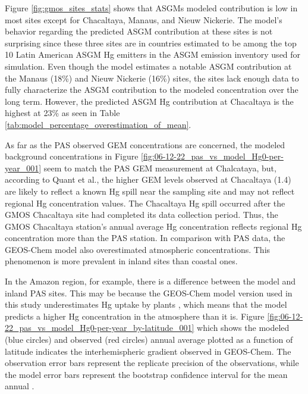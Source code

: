 \begin{flushleft}
Figure \ref{fig:gmos_sites_stats} shows that ASGMs modeled contribution is low in most sites except for Chacaltaya, Manaus, and Nieuw Nickerie. The model's behavior regarding the predicted ASGM contribution at these sites is not surprising since these three sites are in countries estimated to be among the top 10 Latin American ASGM Hg emitters in the ASGM emission inventory used for \gc simulation. Even though the model estimates a notable ASGM contribution at the Manaus (18\%) and Nieuw Nickerie (16\%) sites, the sites lack enough data to fully characterize the ASGM contribution to the modeled \hg concentration over the long term. However, the predicted  ASGM Hg contribution at Chacaltaya is the highest at 23\% as seen in Table \ref{tab:model_percentage_overestimation_of_mean}. 
\end{flushleft}

\begin{flushleft}
 As far as the PAS observed GEM concentrations are concerned, the modeled background \hg concentrations in Figure \ref{fig:06-12-22_pas_vs_model_Hg0-per-year_001} seem to match the PAS GEM measurement at Chalcataya, but, according to Quant et al.\cite{quant_measuring_2021}, the higher GEM levels observed at Chacaltaya (1.4\nang) are likely to reflect a known Hg spill near the sampling site and may not reflect regional Hg concentration values. The Chacaltaya Hg spill occurred after the GMOS Chacaltaya site had completed its data collection period. Thus, the GMOS Chacaltaya station's annual average Hg concentration reflects regional Hg concentration more than the PAS station. In comparison with PAS data, the GEOS-Chem model also overestimated atmospheric concentrations. This phenomenon is more prevalent in inland sites than coastal ones. 
 
 \end{flushleft}

\begin{flushleft}
 In the Amazon region, for example, there is a difference between the model and inland PAS sites. This may be because the GEOS-Chem model version used in this study underestimates Hg uptake by plants \cite{feinberg_evaluating_2022}, which means that the model predicts a higher Hg concentration in the atmosphere than it is. Figure \ref{fig:06-12-22_pas_vs_model_Hg0-per-year_by-latitude_001} which shows the modeled (blue circles) and observed (red circles) annual average \hg plotted as a function of latitude indicates the interhemispheric gradient observed in GEOS-Chem. The observation error bars represent the replicate precision of the observations, while the model error bars represent the \nft bootstrap confidence interval for the mean annual \hg. 
\end{flushleft}
 
